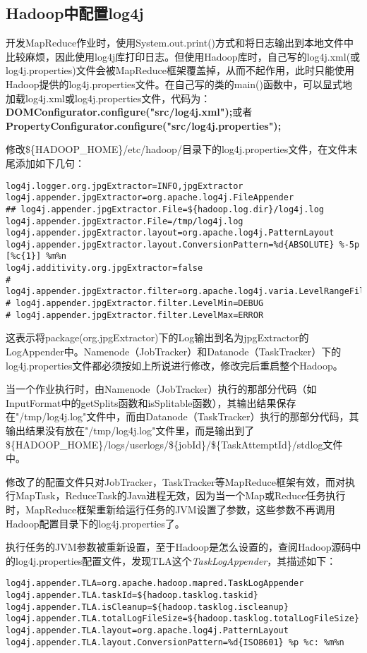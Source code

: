 \subsection{Hadoop中配置log4j}
开发MapReduce作业时，使用System.out.print()方式和将日志输出到本地文件中比较麻烦，因此使用log4j库打印日志。但使用Hadoop库时，自己写的log4j.xml(或log4j.properties)文件会被MapReduce框架覆盖掉，从而不起作用，此时只能使用Hadoop提供的log4j.properties文件。在自己写的类的main()函数中，可以显式地加载log4j.xml或log4j.properties文件，代码为：\textbf{DOMConfigurator.configure("src/log4j.xml");}或者\textbf{PropertyConfigurator.configure("src/log4j.properties");}
\par 修改\$\{HADOOP\_HOME\}/etc/hadoop/目录下的log4j.properties文件，在文件末尾添加如下几句：
\begin{verbatim}
log4j.logger.org.jpgExtractor=INFO,jpgExtractor
log4j.appender.jpgExtractor=org.apache.log4j.FileAppender
## log4j.appender.jpgExtractor.File=${hadoop.log.dir}/log4j.log
log4j.appender.jpgExtractor.File=/tmp/log4j.log
log4j.appender.jpgExtractor.layout=org.apache.log4j.PatternLayout
log4j.appender.jpgExtractor.layout.ConversionPattern=%d{ABSOLUTE} %-5p [%c{1}] %m%n
log4j.additivity.org.jpgExtractor=false
# log4j.appender.jpgExtractor.filter=org.apache.log4j.varia.LevelRangeFilter
# log4j.appender.jpgExtractor.filter.LevelMin=DEBUG
# log4j.appender.jpgExtractor.filter.LevelMax=ERROR
\end{verbatim}
\par 这表示将package(org.jpgExtractor)下的Log输出到名为jpgExtractor的LogAppender中。Namenode（JobTracker）和Datanode（TaskTracker）下的log4j.properties文件都必须按如上所说进行修改，修改完后重启整个Hadoop。
\par 当一个作业执行时，由Namenode（JobTracker）执行的那部分代码（如InputFormat中的getSplits函数和isSplitable函数），其输出结果保存在"/tmp/log4j.log"文件中，而由Datanode（TaskTracker）执行的那部分代码，其输出结果没有放在"/tmp/log4j.log"文件里，而是输出到了\$\{HADOOP\_HOME\}/logs/userlogs/\$\{jobId\}/\$\{TaskAttemptId\}/stdlog文件中。
\par 修改了的配置文件只对JobTracker，TaskTracker等MapReduce框架有效，而对执行MapTask，ReduceTask的Java进程无效，因为当一个Map或Reduce任务执行时，MapReduce框架重新给运行任务的JVM设置了参数，这些参数不再调用Hadoop配置目录下的log4j.properties了。
\par 执行任务的JVM参数被重新设置，至于Hadoop是怎么设置的，查阅Hadoop源码中的log4j.properties配置文件，发现TLA这个\textsl{TaskLogAppender}，其描述如下：
\begin{verbatim}
log4j.appender.TLA=org.apache.hadoop.mapred.TaskLogAppender
log4j.appender.TLA.taskId=${hadoop.tasklog.taskid}
log4j.appender.TLA.isCleanup=${hadoop.tasklog.iscleanup}
log4j.appender.TLA.totalLogFileSize=${hadoop.tasklog.totalLogFileSize}
log4j.appender.TLA.layout=org.apache.log4j.PatternLayout
log4j.appender.TLA.layout.ConversionPattern=%d{ISO8601} %p %c: %m%n
\end{verbatim}
